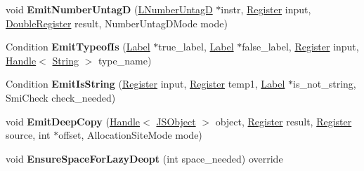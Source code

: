 \begin{DoxyCompactItemize}
\item 
void {\bfseries Emit\+Number\+UntagD} (\hyperlink{classv8_1_1internal_1_1_l_number_untag_d}{L\+Number\+UntagD} $\ast$instr, \hyperlink{structv8_1_1internal_1_1_register}{Register} input, \hyperlink{structv8_1_1internal_1_1_double_register}{Double\+Register} result, Number\+Untag\+D\+Mode mode)\hypertarget{classv8_1_1internal_1_1_l_code_gen_afe9da04662b57d40a181108571021c8c}{}\label{classv8_1_1internal_1_1_l_code_gen_afe9da04662b57d40a181108571021c8c}

\item 
Condition {\bfseries Emit\+Typeof\+Is} (\hyperlink{classv8_1_1internal_1_1_label}{Label} $\ast$true\+\_\+label, \hyperlink{classv8_1_1internal_1_1_label}{Label} $\ast$false\+\_\+label, \hyperlink{structv8_1_1internal_1_1_register}{Register} input, \hyperlink{classv8_1_1internal_1_1_handle}{Handle}$<$ \hyperlink{classv8_1_1internal_1_1_string}{String} $>$ type\+\_\+name)\hypertarget{classv8_1_1internal_1_1_l_code_gen_a5a55e449dc173cc3d5f458623d904e34}{}\label{classv8_1_1internal_1_1_l_code_gen_a5a55e449dc173cc3d5f458623d904e34}

\item 
Condition {\bfseries Emit\+Is\+String} (\hyperlink{structv8_1_1internal_1_1_register}{Register} input, \hyperlink{structv8_1_1internal_1_1_register}{Register} temp1, \hyperlink{classv8_1_1internal_1_1_label}{Label} $\ast$is\+\_\+not\+\_\+string, Smi\+Check check\+\_\+needed)\hypertarget{classv8_1_1internal_1_1_l_code_gen_a23c72e27a6bf50a391c940939754673d}{}\label{classv8_1_1internal_1_1_l_code_gen_a23c72e27a6bf50a391c940939754673d}

\item 
void {\bfseries Emit\+Deep\+Copy} (\hyperlink{classv8_1_1internal_1_1_handle}{Handle}$<$ \hyperlink{classv8_1_1internal_1_1_j_s_object}{J\+S\+Object} $>$ object, \hyperlink{structv8_1_1internal_1_1_register}{Register} result, \hyperlink{structv8_1_1internal_1_1_register}{Register} source, int $\ast$offset, Allocation\+Site\+Mode mode)\hypertarget{classv8_1_1internal_1_1_l_code_gen_a1a84a4d1ebc9ba8736407dd2a6d1214a}{}\label{classv8_1_1internal_1_1_l_code_gen_a1a84a4d1ebc9ba8736407dd2a6d1214a}

\item 
void {\bfseries Ensure\+Space\+For\+Lazy\+Deopt} (int space\+\_\+needed) override\hypertarget{classv8_1_1internal_1_1_l_code_gen_aef92ad7e2537ea5ecfdd73252a97eb48}{}\label{classv8_1_1internal_1_1_l_code_gen_aef92ad7e2537ea5ecfdd73252a97eb48}


\end{DoxyCompactItemize}
